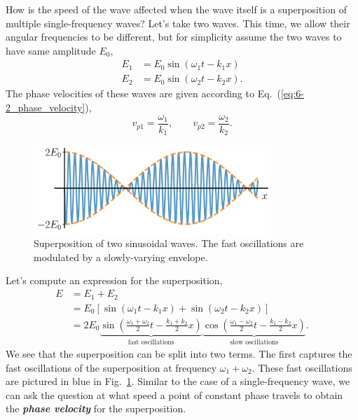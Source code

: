 How is the speed of the wave affected when the wave itself is a superposition of multiple single-frequency waves?
Let's take two waves. This time, we allow their angular frequencies to be different, but for simplicity assume the two waves to have same amplitude $E_0$,
\begin{align}
    E_1 & = E_0 \sin \left(\omega_1 t-k_1 x\right) \\
    E_2 & = E_0 \sin \left(\omega_2 t-k_2 x\right).
\end{align}
The phase velocities of these waves are given according to Eq.~(\ref{eq:6-2_phase_velocity}),
\begin{equation}
    v_{p1} = \frac{\omega_1}{k_1}, \qquad v_{p2} = \frac{\omega_2}{k_2}.
\end{equation}
\begin{figure}[t]
   \centering
    \includegraphics[width=0.8\textwidth]{lesson6/6-2_superpostion_velocity.pdf}    
        \caption[Group velocity]{Superposition of two sinusoidal waves. The fast oscillations are modulated by a slowly-varying envelope.}
        \label{fig:6-2_superposition}
\end{figure}
Let's compute an expression for the superposition,
\begin{align} 
    E & = E_{1} + E_{2} \nonumber\\
     & = E_{0}\left[\sin \left(\omega_{1} t-k_{1} x\right)+\sin \left(\omega_{2} t-k_{2} x\right)\right] \nonumber\\
    & = 2 E_{0} \underbrace{\sin \left( \frac{\omega_{1}+\omega_{2}}{2} t-\frac{k_{1}+k_{2}}{2} x \right)}_{\text{fast oscillations}} \underbrace{ \cos \left( \frac{\omega_{1}-\omega_{2}}{2} t-\frac{k_{1}-k_{2}}{2} x \right)}_{\text{slow oscillations}}.
\end{align}
We see that the superposition can be split into two terms.
The first captures the fast oscillations of the superposition at frequency $\omega_1+\omega_2$.
These fast oscillations are pictured in blue in Fig.~\ref{fig:6-2_superposition}.
Similar to the case of a single-frequency wave, we can ask the question at what speed a point of constant phase travels to obtain the \textit{\textbf{phase velocity}} for the superposition.
